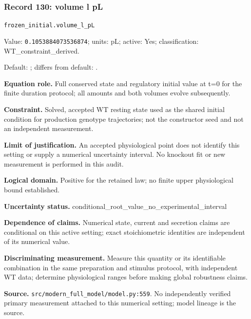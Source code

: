 \subsubsection*{Record 130: volume l pL}
{\small \nolinkurl{frozen_initial.volume_l_pL}\par

Value: \texttt{0.1053884073536874}; units: pL; active: Yes; classification: WT\_constraint\_derived.\par

Default: ; differs from default: .\par

\textbf{Equation role.} Full conserved state and regulatory initial value at t=0 for the finite duration protocol; all amounts and both volumes evolve subsequently.\par

\textbf{Constraint.} Solved, accepted WT resting state used as the shared initial condition for production genotype trajectories; not the constructor seed and not an independent measurement.\par

\textbf{Limit of justification.} An accepted physiological point does not identify this setting or supply a numerical uncertainty interval. No knockout fit or new measurement is performed in this audit.\par

\textbf{Logical domain.} Positive for the retained law; no finite upper physiological bound established.\par

\textbf{Uncertainty status.} conditional\_root\_value\_no\_experimental\_interval\par

\textbf{Dependence of claims.} Numerical state, current and secretion claims are conditional on this active setting; exact stoichiometric identities are independent of its numerical value.\par

\textbf{Discriminating measurement.} Measure this quantity or its identifiable combination in the same preparation and stimulus protocol, with independent WT data; determine physiological ranges before making global robustness claims.\par

\textbf{Source.} \nolinkurl{src/modern_full_model/model.py:559}. No independently verified primary measurement attached to this numerical setting; model lineage is the source.\par}

